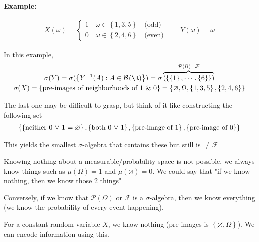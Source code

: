 \par\bigskip
\noindent\textbf{Example:}\par
\begin{equation*}
  \begin{gathered}
    X(\omega)=\begin{cases}1\quad\omega\in \left\{1,3,5\right\}\quad\text{(odd)}\\0\quad\omega\in\left\{2,4,6\right\}\quad\text{(even)}\end{cases}\qquad Y(\omega) = \omega
  \end{gathered}
\end{equation*}\par
\noindent In this example,
\begin{equation*}
  \begin{gathered}
    \sigma(Y) = \sigma(\left\{Y^{-1}(A):A\in\mathcal{B}\left(\R\right)\right\})
    = \sigma\overbrace{(\left\{\left\{1\right\},\cdots,\left\{6\right\}\right\})}^{\mathcal{P}(\Omega) = \mathcal{F}}\\
  \sigma(X) = \left\{\text{pre-images of neighborhoods of 1 \& 0}\right\} = \left\{\varnothing,\Omega,\left\{1,3,5\right\},\left\{2,4,6\right\}\right\}
  \end{gathered}
\end{equation*}\par
\noindent The last one may be difficult to grasp, but think of it like constructing the following set
\begin{equation*}
  \begin{gathered}
    \left\{\left\{\text{neither 0 $\vee$ 1 $ = \varnothing$}\right\},\left\{\text{both 0 $\vee$ 1}\right\}, \left\{\text{pre-image of 1}\right\}, \left\{\text{pre-image of 0}\right\}\right\}
  \end{gathered}
\end{equation*}\par
\noindent This yields the smallest $\sigma$-algebra that contains these but still is $\neq \mathcal{F}$
\par\bigskip
\noindent Knowing nothing about a measurable/probability space is not possible, we always know things such as $\mu(\Omega) = 1$ and $\mu(\varnothing) = 0$. We could say that "if we know nothing, then we know those 2 things"\par
\noindent Conversely, if we know that $\mathcal{P}(\Omega)$ or $\mathcal{F}$ is a $\sigma$-algebra, then we know everything (we know the probability of every event happening). \par
\noindent For a constant random variable $X$, we know nothing (pre-images is $\left\{\varnothing,\Omega\right\}$). We can encode information using this.
